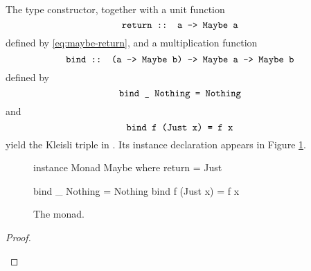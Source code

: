 \begin{example}
  \label{ex:triple-maybe-haskell}

  The  type constructor, together with a unit
  function
  \begin{equation*}
    \text{\texttt{return :: a -> Maybe a}}
  \end{equation*}
  defined by \eqref{eq:maybe-return}, and a multiplication function
  \begin{equation*}
    \text{\texttt{bind :: (a -> Maybe b) -> Maybe a -> Maybe b}}
  \end{equation*}
  defined by
  \begin{equation}
    \label{eq:maybe-bind-nothing}
    \text{\texttt{bind \_ Nothing = Nothing}}
  \end{equation}
  and
  \begin{equation}
    \label{eq:maybe-bind-just}
    \text{\texttt{bind f (Just x) = f x}}
  \end{equation}
  yield the  Kleisli triple in \hask. Its instance
  declaration appears in Figure \ref{fig:triple-maybe-haskell}.

  \begin{figure}[htbp]
    \begin{codehaskell}
instance Monad Maybe where
  return = Just

  bind _ Nothing  = Nothing
  bind f (Just x) = f x
    \end{codehaskell}
    \caption{The  monad.}
    \label{fig:triple-maybe-haskell}
  \end{figure}

  \begin{proof}
    \hfill
    \begin{steps}
    \end{steps}

    \begin{steps}
    \end{steps}

    \begin{steps}
    \end{steps}


\end{proof}
\end{example}
